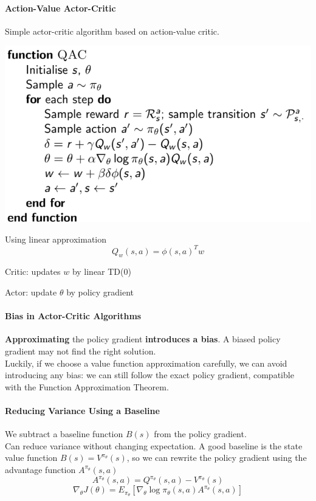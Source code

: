 \documentclass[10pt]{report}
\begin{document}
\paragraph{Action-Value Actor-Critic}
Simple actor-critic algorithm based on action-value critic.
\begin{center}
	\includegraphics[scale=0.5]{184.png}
\end{center}
Using linear approximation $$Q_w(s,a) = \phi(s,a)^Tw$$
\begin{list}{}{}
	\item Critic: updates $w$ by linear TD(0)
	\item Actor: update $\theta$ by policy gradient
\end{list}
\paragraph{Bias in Actor-Critic Algorithms} \textbf{Approximating} the policy gradient \textbf{introduces a bias}. A biased policy gradient may not find the right solution.\\
Luckily, if we choose a value function approximation carefully, we can avoid introducing any bias: we can still follow the exact policy gradient, compatible with the Function Approximation Theorem.
\paragraph{Reducing Variance Using a Baseline} We subtract a baseline function $B(s)$ from the policy gradient.\\
Can reduce variance without changing expectation. A good baseline is the state value function $B(s) = V^{\pi_\theta}(s)$, so we can rewrite the policy gradient using the advantage function $A^{\pi_\theta}(s,a)$
$$A^{\pi_\theta}(s,a) =Q^{\pi_\theta}(s,a)-V^{\pi_\theta}(s)$$
$$\nabla_\theta J(\theta) = E_{\pi_\theta}[\nabla_\theta\log\pi_\theta(s,a)A^{\pi_\theta}(s,a)]$$
\end{document}
